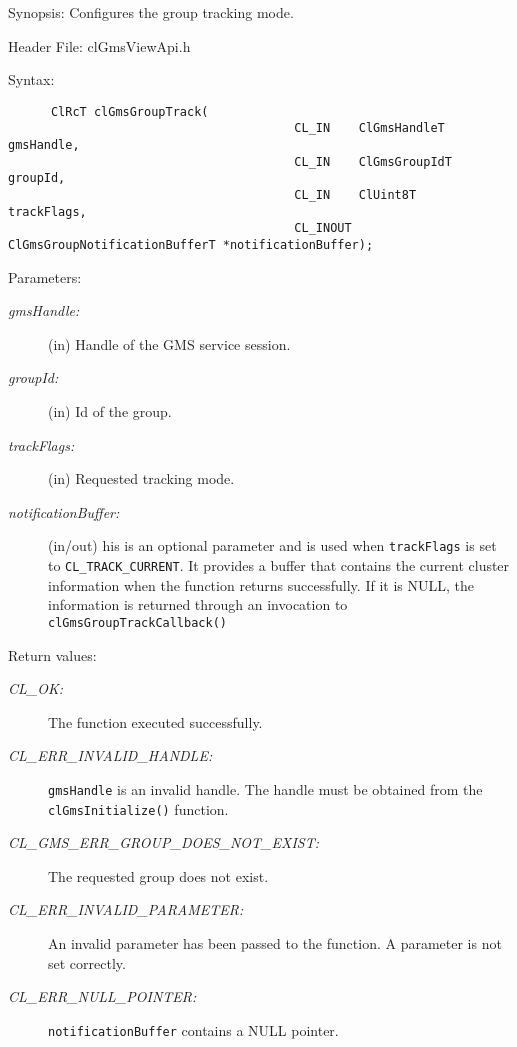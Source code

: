 \begin{flushleft}
\begin{Desc}

\item[Synopsis:]Configures the group tracking mode.\end{Desc}
\begin{Desc}
  \item[Header File:]
  clGmsViewApi.h\end{Desc}
\begin{Desc}
  \item[Syntax:]
  \footnotesize\begin{verbatim}      ClRcT clGmsGroupTrack(
                                		CL_IN    ClGmsHandleT           gmsHandle,
                                		CL_IN    ClGmsGroupIdT          groupId,
                                		CL_IN    ClUint8T               trackFlags,
                                		CL_INOUT ClGmsGroupNotificationBufferT *notificationBuffer);
  \end{verbatim}
  \normalsize
  \end{Desc}

\begin{Desc}
\item[Parameters:]
\begin{description}
  \item[{\em gms\-Handle:}] (in) Handle of the GMS service session.
 \item[{\em groupId:}] (in) Id of the group.
  \item[{\em trackFlags:}] (in) Requested tracking mode.
  \item[{\em notificationBuffer:}] (in/out) his is an optional parameter and is used when {\tt{trackFlags}} is set to {\tt{CL\_\-TRACK\_\-CURRENT}}.
It provides a buffer that contains the current cluster information
when the function returns successfully. If it is NULL, the information is
returned through an invocation to {\tt{clGmsGroupTrackCallback()}}
\end{description}
\end{Desc}

\begin{Desc}
\item[Return values:]
\begin{description}
\item[{\em CL\_\-OK:}]The function executed successfully.
\item[{\em CL\_\-ERR\_\-INVALID\_\-HANDLE:}] {\tt{gmsHandle}} is an invalid handle. The handle must be obtained from the
{\tt{clGmsInitialize()}} function. 
\item[{\em CL\_\-GMS\_\-ERR\_\-GROUP\_\-DOES\_\-NOT\_\-EXIST:}] The requested group does not exist.
 \item[{\em CL\_\-ERR\_\-INVALID\_\-PARAMETER:}] An invalid parameter has been passed to the function. A parameter is not set correctly.
  \item[{\em CL\_\-ERR\_\-NULL\_\-POINTER:}] {\tt{notificationBuffer}} contains a NULL pointer.
 \end{description}
  \end{Desc}


\end{flushleft}
